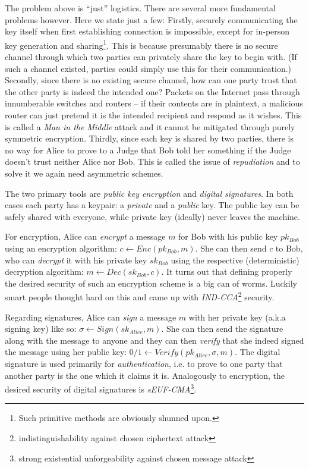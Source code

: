 \documentclass[a4paper,11pt]{article}
\begin{document}
    The problem above is ``just'' logistics. There are several more
    fundamental problems however. Here we state just a few: Firstly, securely
    communicating the key itself when first establishing connection is
    impossible, except for in-person key generation and sharing\footnote{Such
    primitive methods are obviously shunned upon.}. This is because presumably
    there is no secure channel through which two parties can privately share
    the key to begin with. (If such a channel existed, parties could simply
    use this for their communication.) Secondly, since there is no existing
    secure channel, how can one party trust that the other party is indeed the
    intended one? Packets on the Internet pass through innumberable switches
    and routers -- if their contents are in plaintext, a malicious router can
    just pretend it is the intended recipient and respond as it wishes. This
    is called a \emph{Man in the Middle} attack and it cannot be mitigated
    through purely symmetric encryption. Thirdly, since each key is shared by
    two parties, there is no way for Alice to prove to a Judge that Bob told
    her something if the Judge doesn't trust neither Alice nor Bob. This is
    called the issue of \emph{repudiation} and to solve it we again need
    asymmetric schemes.

    The two primary tools are \emph{public key encryption} and
    \emph{digital signatures}. In both cases each party has a keypair: a
    \emph{private} and a \emph{public} key. The public key can be safely
    shared with everyone, while private key (ideally) never leaves the
    machine.

    For encryption, Alice can \emph{encrypt} a message $m$ for Bob with his
    public key $pk_{\mathit{Bob}}$ using an encryption algorithm: $c \gets
    \mathit{Enc}(pk_{\mathit{Bob}}, m)$. She can then send $c$ to Bob, who can
    \emph{decrypt} it with his private key $sk_{\mathit{Bob}}$ using the
    respective (deterministic) decryption algorithm: $m \gets
    \mathit{Dec}(sk_{\mathit{Bob}}, c)$. It turns out that defining properly the
    desired security of such an encryption scheme is a big can of worms. Luckily
    smart people thought hard on this and came up with
    \emph{IND-CCA}\footnote{indistinguishability against chosen ciphertext
    attack} security.

    Regarding signatures, Alice can \emph{sign} a message $m$ with her
    private key (a.k.a signing key) like so: $\sigma \gets
    \mathit{Sign}(sk_{\mathit{Alice}}, m)$. She can then send the signature
    along with the message to anyone and they can then \emph{verify} that
    she indeed signed the message using her public key: $0/1 \gets
    \mathit{Verify}(pk_{\mathit{Alice}}, \sigma, m)$. The digital signature is
    used primarily for \emph{authentication}, i.e. to prove to one party
    that another party is the one which it claims it is. Analogously to
    encryption, the desired security of digital signatures is
    \emph{sEUF-CMA}\footnote{strong existential unforgeability against chosen
    message attack}.
\end{document}
